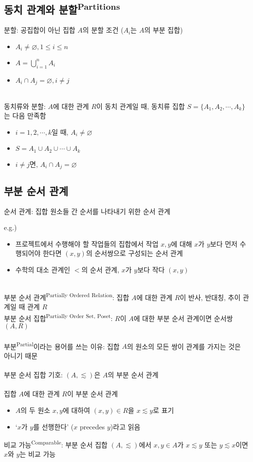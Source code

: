 \subsection{동치 관계와 분할\textsuperscript{Partitions}}
분할: 공집합이 아닌 집합 $A$의 분할 조건 ($A_i$는 $A$의 부분 집합)
\begin{itemize}
    \item $A_i \neq \varnothing, 1 \leq i \leq n$
    \item $A = \bigcup_{i = 1}^n A_i$
    \item $A_i \cap A_j = \varnothing, i \neq j$
\end{itemize}
\phantom{}\\
동치류와 분할: $A$에 대한 관계 $R$이 동치 관계일 때, 동치류 집합 $S=\{A_1, A_2, \cdots, A_k\}$는 다음 만족함
\begin{itemize}
    \item $i = 1, 2, \cdots, k$일 때, $A_i \neq \varnothing$
    \item $S = A_1 \cup A_2 \cup \cdots \cup A_k$
    \item $i \neq j$면, $A_i \cap A_j = \varnothing$
\end{itemize}

\subsection{부분 순서 관계}
순서 관계: 집합 원소들 간 순서를 나타내기 위한 순서 관계

e.g.)
\begin{itemize}
    \item 프로젝트에서 수행해야 할 작업들의 집합에서 작업 $x, y$에 대해 $x$가 $y$보다 먼저 수행되어야 한다면 $(x, y)$의 순서쌍으로 구성되는 순서 관계
    \item 수학의 대소 관계인 $<$의 순서 관계, $x$가 $y$보다 작다 $(x, y)$
\end{itemize}\phantom{}\\
부분 순서 관계\textsuperscript{Partially Ordered Relation}: 집합 $A$에 대한 관계 $R$이 반사, 반대칭, 추이 관계일 때 관계 $R$\\
부분 순서 집합\textsuperscript{Partially Order Set, Poset}: $R$이 $A$에 대한 부분 순서 관계이면 순서쌍 $(A, R)$
\\\\
부분\textsuperscript{Partial}이라는 용어를 쓰는 이유: 집합 $A$의 원소의 모든 쌍이 관계를 가지는 것은 아니기 때문
\\\\
부분 순서 집합 기호: $(A, \lesssim)$은 $A$의 부분 순서 관계
\\\\
집합 $A$에 대한 관계 $R$이 부분 순서 관계
\begin{itemize}
    \item $A$의 두 원소 $x, y$에 대하여 $(x, y) \in R$을 $x \lesssim y$로 표기
    \item `$x$가 $y$를 선행한다' ($x$ precedes $y$)라고 읽음
\end{itemize}
비교 가능\textsuperscript{Comparable}:
부분 순서 집합 $(A, \lesssim)$에서 $x, y \in A$가 $x \lesssim y$ 또는 $y \lesssim x$이면 $x$와 $y$는 비교 가능

